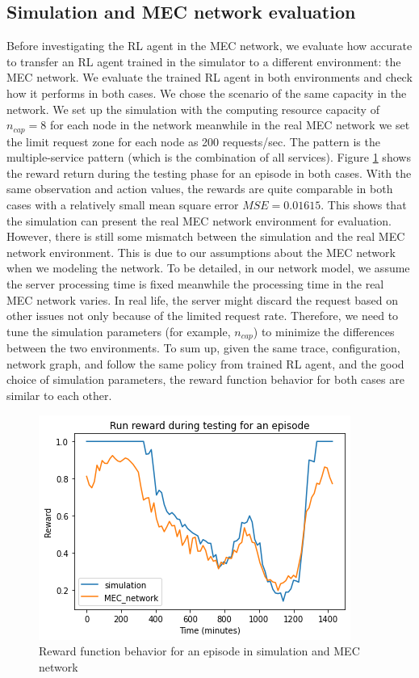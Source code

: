\documentclass[conference]{IEEEtran}
\begin{document}
\subsection{Simulation and MEC network evaluation}
Before investigating the RL agent in the MEC network, we evaluate how accurate to transfer an RL agent trained in the simulator to a different environment: the MEC network. We evaluate the trained RL agent in both environments and check how it performs in both cases. We chose the scenario of the same capacity in the network. We set up the simulation with the computing resource capacity of $n_{cap} = 8$ for each node in the network meanwhile in the real MEC network we set the limit request zone for each node as 200 requests/sec. The pattern is the multiple-service pattern (which is the combination of all services). Figure \ref{fig:sim_real_compare_same_cap} shows the reward return during the testing phase for an episode in both cases. With the same observation and action values, the rewards are quite comparable in both cases with a relatively small mean square error $MSE = 0.01615$. This shows that the simulation can present the real MEC network environment for evaluation. However, there is still some mismatch between the simulation and the real MEC network environment. This is due to our assumptions about the MEC network when we modeling the network. To be detailed, in our network model, we assume the server processing time is fixed meanwhile the processing time in the real MEC network varies. In real life, the server might discard the request based on other issues not only because of the limited request rate. Therefore, we need to tune the simulation parameters (for example, $n_{cap}$) to minimize the differences between the two environments. To sum up, given the same trace, configuration, network graph, and follow the same policy from trained RL agent, and the good choice of simulation parameters, the reward function behavior for both cases are similar to each other.

\begin{figure}[]
    \centering
    \includegraphics[scale = 0.5]{imgs/sim_real_compare_same_cap.png}
    \caption{Reward function behavior for an episode in simulation and MEC network}
    \label{fig:sim_real_compare_same_cap}
\end{figure}
\end{document}
